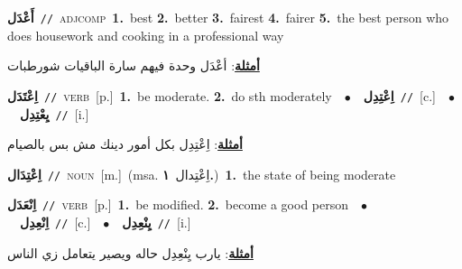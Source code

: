 \documentclass[10pt,a4paper,twoside]{article} %
\begin{document}
\begin{multicols}{2}
{\setlength\topsep{0pt}\textbf{\foreignlanguage{arabic}{أَعْدَل}}\ {\color{gray}\texttt{//}\color{black}}\ \textsc{adj\textunderscore comp}\ \textbf{1.}~best  \textbf{2.}~better  \textbf{3.}~fairest  \textbf{4.}~fairer  \textbf{5.}~the best person who does housework and cooking in a professional way\  \begin{flushright}\color{gray}\foreignlanguage{arabic}{\textbf{\underline{\foreignlanguage{arabic}{أمثلة}}}: أعْدَل وحدة فيهم سارة الباقيات شورطبات}\end{flushright}\color{black}} \vspace{2mm}

{\setlength\topsep{0pt}\textbf{\foreignlanguage{arabic}{اِعْتَدَل}}\ {\color{gray}\texttt{//}\color{black}}\ \textsc{verb}\ [p.]\ \textbf{1.}~be moderate.  \textbf{2.}~do sth moderately\ \ $\bullet$\ \ \setlength\topsep{0pt}\textbf{\foreignlanguage{arabic}{اِعْتِدِل}}\ {\color{gray}\texttt{//}\color{black}}\ [c.]\ \ $\bullet$\ \ \setlength\topsep{0pt}\textbf{\foreignlanguage{arabic}{يِعْتِدِل}}\ {\color{gray}\texttt{//}\color{black}}\ [i.]\  \begin{flushright}\color{gray}\foreignlanguage{arabic}{\textbf{\underline{\foreignlanguage{arabic}{أمثلة}}}: اِعْتِدِل بكل أمور دينك مش بس بالصيام}\end{flushright}\color{black}} \vspace{2mm}

{\setlength\topsep{0pt}\textbf{\foreignlanguage{arabic}{اِعْتِدَال}}\ {\color{gray}\texttt{//}\color{black}}\ \textsc{noun}\ [m.]\ \color{gray}(msa. \foreignlanguage{arabic}{اِعْتِدال}~\foreignlanguage{arabic}{\textbf{١.}})\color{black}\ \textbf{1.}~the state of being moderate\ } \vspace{2mm}

{\setlength\topsep{0pt}\textbf{\foreignlanguage{arabic}{اِنْعَدَل}}\ {\color{gray}\texttt{//}\color{black}}\ \textsc{verb}\ [p.]\ \textbf{1.}~be modified.  \textbf{2.}~become a good person\ \ $\bullet$\ \ \setlength\topsep{0pt}\textbf{\foreignlanguage{arabic}{اِنْعِدِل}}\ {\color{gray}\texttt{//}\color{black}}\ [c.]\ \ $\bullet$\ \ \setlength\topsep{0pt}\textbf{\foreignlanguage{arabic}{يِنْعِدِل}}\ {\color{gray}\texttt{//}\color{black}}\ [i.]\  \begin{flushright}\color{gray}\foreignlanguage{arabic}{\textbf{\underline{\foreignlanguage{arabic}{أمثلة}}}: يارب يِنْعِدِل حاله ويصير يتعامل زي الناس}\end{flushright}\color{black}} \vspace{2mm}


\end{multicols}
\end{document}
